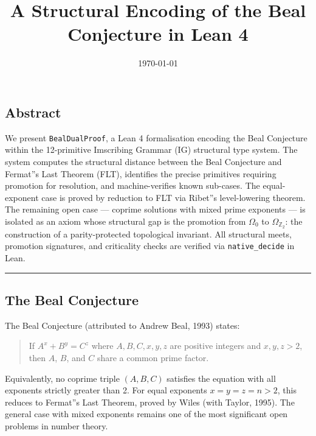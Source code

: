 \documentclass[12pt,a4paper]{article}
\begin{document}
\title{A Structural Encoding of the Beal Conjecture in Lean 4}
\date{\today}

\maketitle

\subsection{Abstract}

We present \texttt{BealDualProof}, a Lean 4 formalisation encoding the Beal Conjecture within the 12-primitive Imscribing Grammar (IG) structural type system. The system computes the structural distance between the Beal Conjecture and Fermat''s Last Theorem (FLT), identifies the precise primitives requiring promotion for resolution, and machine-verifies known sub-cases. The equal-exponent case is proved by reduction to FLT via Ribet''s level-lowering theorem. The remaining open case --- coprime solutions with mixed prime exponents --- is isolated as an axiom whose structural gap is the promotion from $\Omega_0$ to $\Omega_{\mathbb{Z}_2}$: the construction of a parity-protected topological invariant. All structural meets, promotion signatures, and criticality checks are verified via \texttt{native\_decide} in Lean.

\begin{center}
\rule{0.5\textwidth}{0.4pt}
\end{center}

\subsection{The Beal Conjecture}

The Beal Conjecture (attributed to Andrew Beal, 1993) states:

\begin{quote}
If $A^x + B^y = C^z$ where $A, B, C, x, y, z$ are positive integers and $x, y, z > 2$, then $A$, $B$, and $C$ share a common prime factor.

\end{quote}

Equivalently, no coprime triple $(A,B,C)$ satisfies the equation with all exponents strictly greater than 2. For equal exponents $x = y = z = n > 2$, this reduces to Fermat''s Last Theorem, proved by Wiles (with Taylor, 1995). The general case with mixed exponents remains one of the most significant open problems in number theory.
\end{document}
